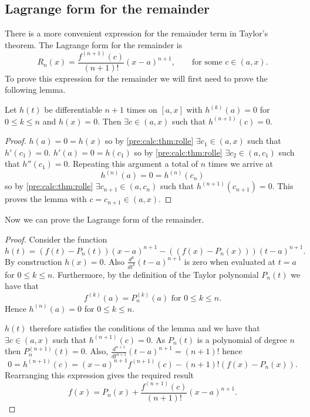 \documentclass[10pt, a4paper]{article}
\begin{document}
\subsection{Lagrange form for the remainder}
There is a more convenient expression for the remainder term in Taylor's theorem.
The Lagrange form for the remainder is
\[
R_n(x) = \frac{f ^ {(n + 1)}(c)}{(n + 1)!}(x - a) ^ {n + 1},\qquad\text{for some } c \in (a, x).
\]
To prove this expression for the remainder we will first need to prove the following lemma.
\begin{lemma}
    Let $h(t)$ be differentiable $n + 1$ times on $[a, x]$ with $h ^ {(k)}(a) = 0$ for $0 \leq k \leq n$ and $h(x) = 0$.
    Then $\exists c \in (a, x)$ such that $h ^ {(n + 1)}(c) = 0$.

    \begin{proof}
        $h(a) = 0 = h(x)$ so by \autoref{pre:calc:thm:rolle} $\exists c_1 \in (a, x)$ such that $h'(c_1) = 0$.
        $h'(a) = 0 = h(c_1)$ so by \autoref{pre:calc:thm:rolle} $\exists c_2 \in (a, c_1)$ such that $h''(c_1) = 0$.
        Repeating this argument a total of $n$ times we arrive at
        \[
        h ^ {(n)}(a) = 0 = h ^ {(n)}(c_n)
        \]
        so by \autoref{pre:calc:thm:rolle} $\exists c_{n + 1} \in (a, c_n)$ such that $h ^ {(n + 1)}(c_{n + 1}) = 0$.
        This proves the lemma with $c = c_{n + 1} \in (a, x)$.
    \end{proof}
\end{lemma}

Now we can prove the Lagrange form of the remainder.
\begin{proof}
    Consider the function
    \[
    h(t) = (f(t) - P_n(t))(x - a) ^ {n + 1} - ((f(x) - P_n(x)))(t - a) ^ {n + 1}.
    \]
    By construction $h(x) = 0$.
    Also $\frac{d ^ k}{dt ^ k}(t - a) ^ {n + 1}$ is zero when evaluated at $t = a$ for $0 \leq k \leq n$.
    Furthermore,
    by the definition of the Taylor polynomial $P_n(t)$ we have that
    \[
    f ^ {(k)}(a) = P_n^{(k)}(a)\text{ for } 0 \leq k \leq n.
    \]
    Hence $h ^ {(n)}(a) = 0$ for $0 \leq k \leq n$.

    $h(t)$ therefore satisfies the conditions of the lemma and we have that $\exists c \in (a, x)$ such that $h ^ {(n + 1)}(c) = 0$.
    As $P_n(t)$ is a polynomial of degree $n$ then $P_n ^ {(n + 1)}(t) = 0$.
    Also,
    $\frac{d ^ {n + 1}}{dt ^ {n + 1}}(t - a) ^ {n + 1} = (n + 1)!$ hence
    \[
    0 = h ^ {(n + 1)}(c) = (x - a) ^ {n + 1}f ^ {(n + 1)}(c) - (n + 1)!(f(x) - P_n(x)).
    \]
    Rearranging this expression gives the required result
    \[
    f(x) = P_n(x) + \frac{f ^ {(n + 1)}(c)}{(n + 1)!}(x - a) ^ {n + 1}.
    \]
\end{proof}
\end{document}
